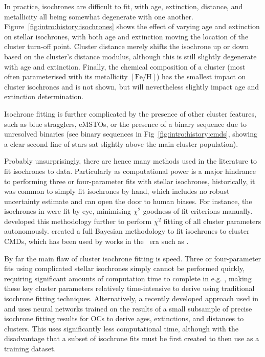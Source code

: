 In practice, isochrones are difficult to fit, with age, extinction, distance, and metallicity all being somewhat degenerate with one another. Figure~\ref{fig:intro:history:isochrones} shows the effect of varying age and extinction on stellar isochrones, with both age and extinction moving the location of the cluster turn-off point. Cluster distance merely shifts the isochrone up or down based on the cluster's distance modulus, although this is still slightly degenerate with age and extinction. Finally, the chemical composition of a cluster (most often parameterised with its metallicity $\left[\text{Fe}/\text{H}\right]$) has the smallest impact on cluster isochrones and is not shown, but will nevertheless slightly impact age and extinction determination.

Isochrone fitting is further complicated by the presence of other cluster features, such as blue stragglers, eMSTOs, or the presence of a binary sequence due to unresolved binaries (see binary sequences in Fig~\ref{fig:intro:history:cmds}, showing a clear second line of stars sat slightly above the main cluster population).

Probably unsurprisingly, there are hence many methods used in the literature to fit isochrones to data. Particularly as computational power is a major hindrance to performing three or four-parameter fits with stellar isochrones, historically, it was common to simply fit isochrones by hand, which includes no robust uncertainty estimate and can open the door to human biases. For instance, the isochrones in \cite{kharchenko_global_2013} were fit by eye, minimising $\chi^2$ goodness-of-fit criterions manually. \cite{yen_reanalysis_2018} developed this methodology further to perform $\chi^2$ fitting of all cluster parameters autonomously. \cite{hippel_inverting_2006} created a full Bayesian methodology to fit isochrones to cluster CMDs, which has been used by works in the \gaia\ era such as \cite{bossini_age_2019}.

By far the main flaw of cluster isochrone fitting is speed. Three or four-parameter fits using complicated stellar isochrones simply cannot be performed quickly, requiring significant amounts of computation time to complete in e.g. \cite{yen_reanalysis_2018}, making these key cluster parameters relatively time-intensive to derive using traditional isochrone fitting techniques. Alternatively, a recently developed approach used in \cite{cantat-gaudin_painting_2020} and \cite{kounkel_untangling_2020} uses neural networks trained on the results of a small subsample of precise isochrone fitting results for OCs to derive ages, extinctions, and distances to clusters. This uses significantly less computational time, although with the disadvantage that a subset of isochrone fits must be first created to then use as a training dataset.


